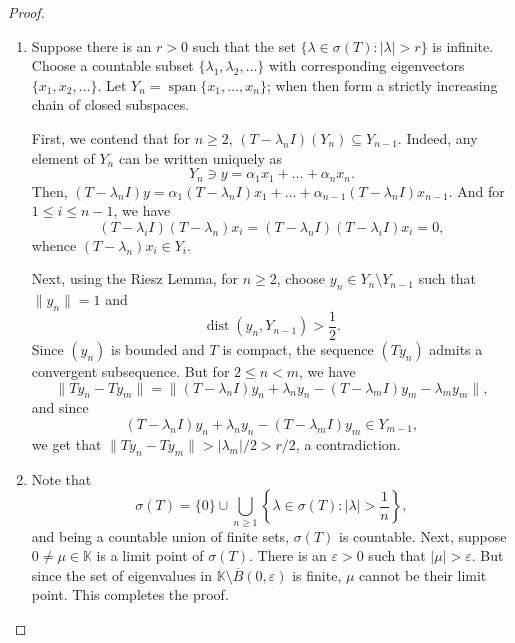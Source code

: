 \documentclass[12pt]{article}
\theoremstyle{thmstyle}
\theoremstyle{defstyle}
\newcommand{\R}{\mathbb{R}}
\newcommand{\bbC}{\mathbb{C}}
\newcommand{\K}{\mathbb{K}} %
\renewcommand{\le}{\leqslant}
\renewcommand{\ge}{\geqslant}
\begin{document}
\begin{proof}
\begin{enumerate}[label=(\alph*)]
    \item Suppose there is an $r > 0$ such that the set $\{\lambda\in\sigma(T)\colon|\lambda| > r\}$ is infinite. Choose a countable subset $\{\lambda_1,\lambda_2,\dots\}$ with corresponding eigenvectors $\{x_1, x_2,\dots\}$. Let $Y_n = \operatorname{span}\{x_1,\dots, x_n\}$; when then form a strictly increasing chain of closed subspaces.

    First, we contend that for $n\ge 2$, $(T - \lambda_n I)(Y_n)\subseteq Y_{n - 1}$. Indeed, any element of $Y_n$ can be written uniquely as 
    \begin{equation*}
        Y_n \ni y = \alpha_1x_1 + \dots + \alpha_nx_n.
    \end{equation*}
    Then, $(T - \lambda_nI)y = \alpha_1(T - \lambda_n I)x_1 + \dots + \alpha_{n - 1}(T - \lambda_n I)x_{n - 1}$. And for $1\le i\le n - 1$, we have 
    \begin{equation*}
        (T - \lambda_i I)(T - \lambda_n)x_i = (T - \lambda_n I)(T - \lambda_iI)x_i = 0,
    \end{equation*}
    whence $(T - \lambda_n)x_i\in Y_i$.

    Next, using the Riesz Lemma, for $n\ge 2$, choose $y_n\in Y_n\setminus Y_{n - 1}$ such that $\|y_n\| = 1$ and 
    \begin{equation*}
        \operatorname{dist}(y_n, Y_{n - 1}) > \frac{1}{2}.
    \end{equation*}
    Since $(y_n)$ is bounded and $T$ is compact, the sequence $(Ty_n)$ admits a convergent subsequence. But for $2\le n < m$, we have
    \begin{equation*}
        \|Ty_n - Ty_m\| = \|(T - \lambda_n I)y_n + \lambda_ny_n - (T - \lambda_m I)y_m - \lambda_my_m\|,
    \end{equation*}
    and since 
    \begin{equation*}
        (T - \lambda_nI)y_n + \lambda_ny_n - (T - \lambda_mI)y_m\in Y_{m - 1},
    \end{equation*}
    we get that $\|Ty_n - Ty_m\| > |\lambda_m|/2 > r/2$, a contradiction.

    \item Note that 
    \begin{equation*}
        \sigma(T) = \{0\}\cup\bigcup_{n\ge 1}\left\{\lambda\in\sigma(T)\colon |\lambda| > \frac{1}{n}\right\},
    \end{equation*}
    and being a countable union of finite sets, $\sigma(T)$ is countable. Next, suppose $0\ne\mu\in\K$ is a limit point of $\sigma(T)$. There is an $\varepsilon > 0$ such that $|\mu| > \varepsilon$. But since the set of eigenvalues in $\K\setminus\overline{B}(0,\varepsilon)$ is finite, $\mu$ cannot be their limit point. This completes the proof. \qedhere
\end{enumerate}
\end{proof}
\end{document}
